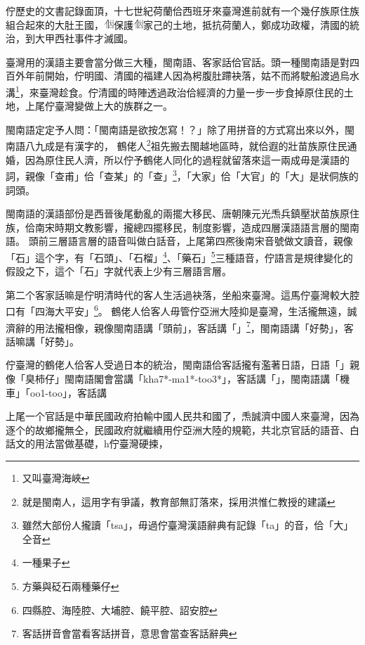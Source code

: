 \documentclass[final,oneside,onecolumn,12pt,a4paper]{book}%
\begin{document}
佇歷史的文書記錄面頂，十七世紀荷蘭佮西班牙來臺灣進前就有一个幾仔族原住族組合起來的大肚王國\cite{大肚王國}，\includegraphics[height=1em]{字/⿰因}保護\includegraphics[height=1em]{字/⿰因}家己的土地，抵抗荷蘭人，鄭成功政權，清國的統治，到大甲西社事件才滅國。

臺灣用的漢語主要會當分做三大種，閩南語、客家話佮官話\cite{外省族群的母語與國語}。頭一種閩南語是對四百外年前開始，佇明國、清國的福建人因為枵腹肚蹛袂落，姑不而將駛船渡過烏水溝\footnote{又叫臺灣海峽}，來臺灣趁食。佇清國的時陣透過政治佮經濟的力量一步一步食掉原住民的土地，上尾佇臺灣變做上大的族群之一。

閩南語定定予人問：「閩南語是欲按怎寫！？」除了用拼音的方式寫出來以外，閩南語八九成是有漢字的\cite{愛揣}，%
鶴佬人\footnote{就是閩南人，這用字有爭議，教育部無訂落來，採用洪惟仁教授的建議\cite{愛揣}}祖先搬去閩越地區時，就佮遐的壯苗族原住民通婚，因為原住民人濟，所以佇予鶴佬人同化的過程就留落來這一兩成毋是漢語的詞\cite{董忠司}，親像「查甫」佮「查某」的「查」\footnote{雖然大部份人攏讀「tsa」，毋過佇臺灣漢語辭典\cite{臺灣漢語辭典}有記錄「ta」的音，佮「大」仝音}，「大家」佮「大官」的「大」是狀侗族的詞頭。

閩南語的漢語部份是西晉後尾動亂的兩擺大移民、唐朝陳元光𤆬兵鎮壓狀苗族原住族，佮南宋時期文教影響，攏總四擺移民，制度影響，造成四層漢語語言層的閩南語\cite{閩客方言史稿}。
頭前三層語言層的語音叫做白話音，上尾第四凞後南宋音號做文讀音，親像「石」這个字，有「石頭」、「石榴」\footnote{一種果子}、「藥石」\footnote{方藥與砭石兩種藥仔}三種語音，佇語言是規律變化的假設之下，這个「石」字就代表上少有三層語言層。

第二个客家話嘛是佇明清時代的客人生活過袂落，坐船來臺灣。這馬佇臺灣較大腔口有「四海大平安」\footnote{四縣腔、海陸腔、大埔腔、饒平腔、詔安腔}。
鶴佬人佮客人毋管佇亞洲大陸抑是臺灣，生活攏無遠，誠濟辭的用法攏相像，親像閩南語講「頭前」，客話講「」\footnote{客話拼音會當看客話拼音\cite{客話拼音}，意思會當查客話辭典\cite{客話辭典}}，閩南語講「好勢」，客話嘛講「好勢」。

佇臺灣的鶴佬人佮客人受過日本的統治，閩南語佮客話攏有濫著日語，日語「」親像「臭柿仔」閩南語閣會當講「kha7*-ma1*-too3*」，客話講「」，閩南語講「機車」「oo1-too」，客話講

上尾一个官話是中華民國政府拍輸中國人民共和國了，𤆬誠濟中國人來臺灣，因為逐个的故鄉攏無仝，民國政府就繼續用佇亞洲大陸的規範，共北京官話的語音、白話文的用法當做基礎，h佇臺灣硬捒，
\end{document}
